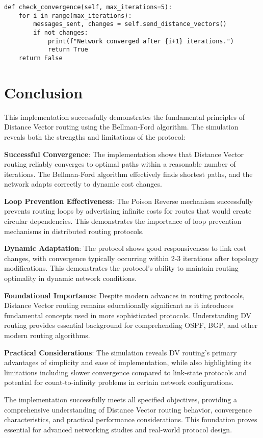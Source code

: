 \documentclass[12pt,a4paper]{article}
\begin{document}
\begin{lstlisting}[caption={Convergence Detection Solution}]
def check_convergence(self, max_iterations=5):
    for i in range(max_iterations):
        messages_sent, changes = self.send_distance_vectors()
        if not changes:
            print(f"Network converged after {i+1} iterations.")
            return True
    return False
\end{lstlisting}

\section{Conclusion}

This implementation successfully demonstrates the fundamental principles of Distance Vector routing using the Bellman-Ford algorithm. The simulation reveals both the strengths and limitations of the protocol:

\textbf{Successful Convergence}: The implementation shows that Distance Vector routing reliably converges to optimal paths within a reasonable number of iterations. The Bellman-Ford algorithm effectively finds shortest paths, and the network adapts correctly to dynamic cost changes.

\textbf{Loop Prevention Effectiveness}: The Poison Reverse mechanism successfully prevents routing loops by advertising infinite costs for routes that would create circular dependencies. This demonstrates the importance of loop prevention mechanisms in distributed routing protocols.

\textbf{Dynamic Adaptation}: The protocol shows good responsiveness to link cost changes, with convergence typically occurring within 2-3 iterations after topology modifications. This demonstrates the protocol's ability to maintain routing optimality in dynamic network conditions.

\textbf{Foundational Importance}: Despite modern advances in routing protocols, Distance Vector routing remains educationally significant as it introduces fundamental concepts used in more sophisticated protocols. Understanding DV routing provides essential background for comprehending OSPF, BGP, and other modern routing algorithms.

\textbf{Practical Considerations}: The simulation reveals DV routing's primary advantages of simplicity and ease of implementation, while also highlighting its limitations including slower convergence compared to link-state protocols and potential for count-to-infinity problems in certain network configurations.

The implementation successfully meets all specified objectives, providing a comprehensive understanding of Distance Vector routing behavior, convergence characteristics, and practical performance considerations. This foundation proves essential for advanced networking studies and real-world protocol design.
\end{document}
